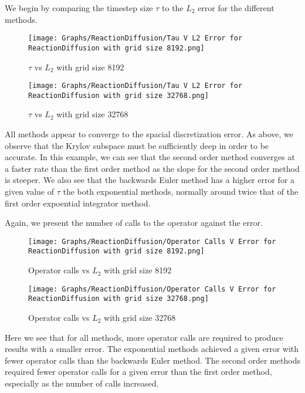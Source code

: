 We begin by comparing the timestep size $\tau$ to the $L_2$ error for the different methods.
\begin{figure}[H]
    \centering
    \begin{minipage}{0.49\textwidth}
        \texttt{[image: Graphs/ReactionDiffusion/Tau V L2 Error for ReactionDiffusion with grid size 8192.png]} %
        \caption{$\tau$ vs $L_2$ with grid size 8192}
        \label{fig:ACtauE}
    \end{minipage}\hfill
    \centering
    \begin{minipage}{0.49\textwidth}
        \texttt{[image: Graphs/ReactionDiffusion/Tau V L2 Error for ReactionDiffusion with grid size 32768.png]} %
        \caption{$\tau$ vs $L_2$ with grid size 32768}
        \label{fig:ACtauE1024}
    \end{minipage}\hfill
\end{figure}
All methods appear to converge to the spacial discretization error.
As above, we observe that the Krylov subspace must be sufficiently deep in order to be accurate.
In this example, we can see that the second order method converges at a faster rate than the first order method as the slope for the second order method is steeper.
We also see that the backwards Euler method has a higher error for a given value of $\tau$ the both exponential methods, normally around twice that of the first order expoential integrator method.

Again, we present the number of calls to the operator against the error.
\begin{figure}[H]
    \centering
    \begin{minipage}{0.49\textwidth}
        \texttt{[image: Graphs/ReactionDiffusion/Operator Calls V Error for ReactionDiffusion with grid size 8192.png]} %
        \caption{Operator calls vs $L_2$ with grid size 8192}
        \label{fig:plot1}
    \end{minipage}\hfill
    \centering
    \begin{minipage}{0.49\textwidth}
        \texttt{[image: Graphs/ReactionDiffusion/Operator Calls V Error for ReactionDiffusion with grid size 32768.png]} %
        \caption{Operator calls vs $L_2$ with grid size 32768}
        \label{fig:plot2}
    \end{minipage}\hfill
\end{figure}
Here we see that for all methods, more operator calls are required to produce results with a smaller error.
The exponential methods achieved a given error with fewer operator calls than the backwards Euler method.
The second order methods required fewer operator calls for a given error than the first order method, especially as the number of calls increased.


